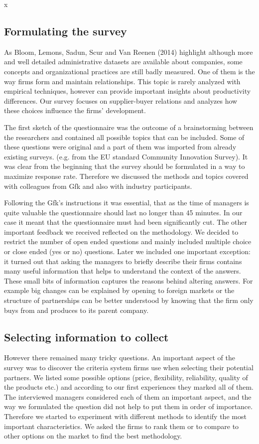 x\documentclass[final, dvipsnames, authoryear,12pt]{elsarticle}
\begin{document}
\subsection{Formulating the survey }

As Bloom, Lemons, Sadun, Scur and Van Reenen (2014) highlight although more and well detailed administrative datasets are available about companies, some concepts and organizational practices are still badly measured. One of them is the way firms form and maintain relationships. This topic is rarely analyzed with empirical techniques, however can provide important insights about productivity differences. Our survey focuses on supplier-buyer relations and analyzes how these choices influence the firms’ development.

The first sketch of the questionnaire was the outcome of a brainstorming between the researchers and contained all possible topics that can be included. Some of these questions were original and a part of them was imported from already existing surveys. (e.g. from the EU standard Community Innovation Survey). It was clear from the beginning that the survey should be formulated in a way to maximize response rate. Therefore we discussed the methods and topics covered with colleagues from Gfk and also with industry participants.

Following the Gfk’s instructions it was essential, that as the time of managers is quite valuable the questionnaire should last no longer than 45 minutes. In our case it meant that the questionnaire must had been significantly cut. The other important feedback we received reflected on the methodology. We decided to restrict the number of open ended questions and mainly included multiple choice or close ended (yes or no) questions. Later we included one important exception: it turned out that asking the managers to briefly describe their firms contains many useful information that helps to understand the context of the answers. These small bits of information captures the reasons behind altering answers. For example big changes can be explained by opening to foreign markets or the structure of partnerships can be better understood by knowing that the firm only buys from and produces to its parent company.

\subsection{Selecting information to collect}

However there remained many tricky questions. An important aspect of the survey was to discover the criteria system firms use when selecting their potential partners. We listed some possible options (price, flexibility, reliability, quality of the products etc.) and according to our first experiences they marked all of them. The interviewed managers considered each of them an important aspect, and the way we formulated the question did not help to put them in order of importance.  Therefore we started to experiment with different methods to identify the most important characteristics. We asked the firms to rank them or to compare to other options on the market to find the best methodology.
\end{document}
